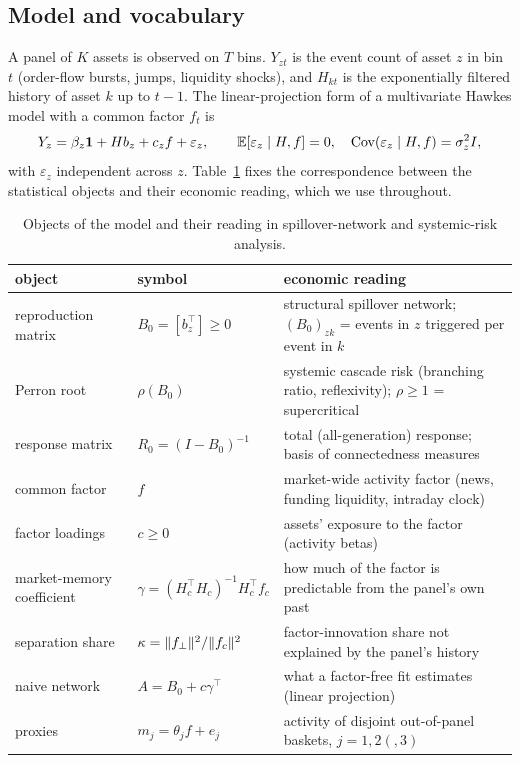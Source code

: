\documentclass[12pt]{article}
\theoremstyle{plain}\newtheorem{theorem}{Theorem}[section]\newtheorem{proposition}[theorem]{Proposition}\newtheorem{lemma}[theorem]{Lemma}\newtheorem{corollary}[theorem]{Corollary}
\theoremstyle{definition}\newtheorem{definition}[theorem]{Definition}\newtheorem{assumption}[theorem]{Assumption}\newtheorem{remark}[theorem]{Remark}
\begin{document}
\subsection{Model and vocabulary}
A panel of $K$ assets is observed on $T$ bins. $Y_{zt}$ is the event count of asset $z$ in bin $t$ (order-flow bursts, jumps, liquidity shocks), and $H_{kt}$ is the exponentially filtered history of asset $k$ up to $t-1$. The linear-projection form of a multivariate Hawkes model with a common factor $f_t$ is
\begin{equation}\label{eq:model}
Y_z=\beta_z\mathbf 1+Hb_z+c_zf+\varepsilon_z,\qquad \mathbb{E}[\varepsilon_z\mid H,f]=0,\quad \operatorname{Cov}(\varepsilon_z\mid H,f)=\sigma_z^2I,
\end{equation}
with $\varepsilon_z$ independent across $z$. Table~\ref{tab:vocab} fixes the correspondence between the statistical objects and their economic reading, which we use throughout.
\begin{table}[t]\centering\small
\caption{Objects of the model and their reading in spillover-network and systemic-risk analysis.}\label{tab:vocab}
\begin{tabularx}{\textwidth}{@{}>{\raggedright\arraybackslash}p{}>{\raggedright\arraybackslash}p{}>{\raggedright\arraybackslash}X@{}}\toprule
object & symbol & economic reading\\\midrule
reproduction matrix & $B_0=[b_z^{\top}]\ge0$ & structural spillover network; $(B_0)_{zk}$ = events in $z$ triggered per event in $k$\\
Perron root & $\rho(B_0)$ & systemic cascade risk (branching ratio, reflexivity); $\rho\ge1$ = supercritical\\
response matrix & $R_0=(I-B_0)^{-1}$ & total (all-generation) response; basis of connectedness measures\\
common factor & $f$ & market-wide activity factor (news, funding liquidity, intraday clock)\\
factor loadings & $c\ge0$ & assets' exposure to the factor (activity betas)\\
market-memory coefficient & $\gamma=(H_c^\top H_c)^{-1}H_c^\top f_c$ & how much of the factor is predictable from the panel's own past\\
separation share & $\kappa=\|f_\perp\|^2/\|f_c\|^2$ & factor-innovation share not explained by the panel's history\\
naive network & $A=B_0+c\gamma^{\top}$ & what a factor-free fit estimates (linear projection)\\
proxies & $m_j=\theta_jf+e_j$ & activity of disjoint out-of-panel baskets, $j=1,2(,3)$\\\bottomrule
\end{tabularx}
\end{table}
\end{document}
